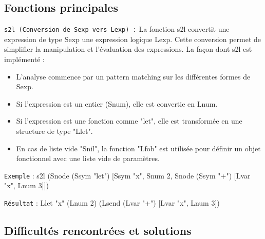 \documentclass{article}
\begin{document}
\subsection{Fonctions principales}
\texttt{s2l (Conversion de Sexp vers Lexp) :} La fonction s2l convertit une expression de type Sexp une expression logique Lexp. Cette conversion permet de simplifier la manipulation et l’évaluation des expressions.
La façon dont s2l est implémenté :
\begin{itemize}
    \item L’analyse commence par un pattern matching sur les différentes formes de Sexp.
    \item Si l’expression est un entier (Snum), elle est convertie en Lnum.
    \item Si l’expression est une fonction comme "let", elle est transformée en une structure de type "Llet".
    \item En cas de liste vide "Snil", la fonction "Lfob" est utilisée pour définir un objet fonctionnel avec une liste vide de paramètres.
\end{itemize}
\texttt{Exemple} : s2l (Snode (Ssym "let") [Ssym "x", Snum 2, Snode (Ssym "+") [Lvar "x", Lnum 3]])

\hspace{1cm}\texttt{Résultat} : Llet "x" (Lnum 2) (Lsend (Lvar "+") [Lvar "x", Lnum 3])


\subsection{Difficultés rencontrées et solutions}
\end{document}
